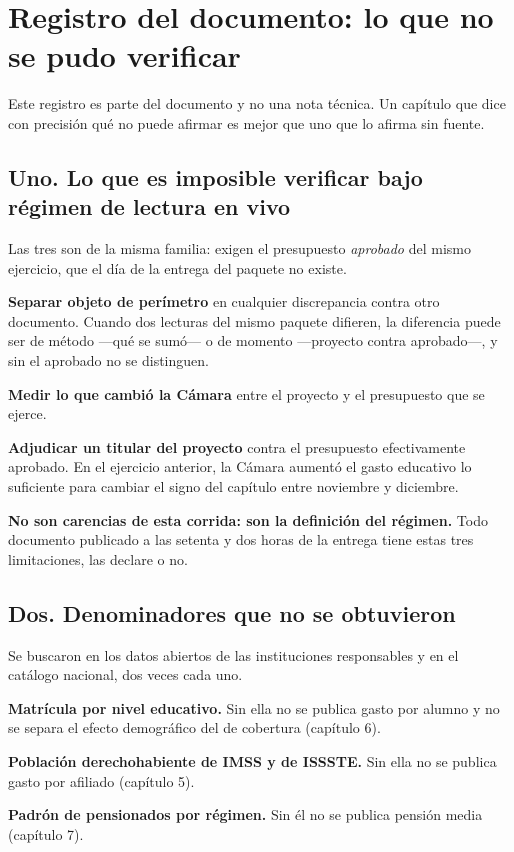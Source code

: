 \chapter*{Registro del documento: lo que no se pudo verificar}

Este registro es parte del documento y no una nota técnica. Un capítulo que dice con precisión
qué no puede afirmar es mejor que uno que lo afirma sin fuente.

\section*{Uno. Lo que es imposible verificar bajo régimen de lectura en vivo}

Las tres son de la misma familia: exigen el presupuesto \emph{aprobado} del mismo ejercicio,
que el día de la entrega del paquete no existe.

\begin{list}{}{\setlength{\leftmargin}{1.4em}\setlength{\itemsep}{3pt}}
\item[1.] \textbf{Separar objeto de perímetro} en cualquier discrepancia contra otro
documento. Cuando dos lecturas del mismo paquete difieren, la diferencia puede ser de método
---qué se sumó--- o de momento ---proyecto contra aprobado---, y sin el aprobado no se
distinguen.
\item[2.] \textbf{Medir lo que cambió la Cámara} entre el proyecto y el presupuesto que se
ejerce.
\item[3.] \textbf{Adjudicar un titular del proyecto} contra el presupuesto efectivamente
aprobado. En el ejercicio anterior, la Cámara aumentó el gasto educativo lo suficiente para
cambiar el signo del capítulo entre noviembre y diciembre.
\end{list}

\textbf{No son carencias de esta corrida: son la definición del régimen.} Todo documento
publicado a las setenta y dos horas de la entrega tiene estas tres limitaciones, las declare o
no.

\section*{Dos. Denominadores que no se obtuvieron}

Se buscaron en los datos abiertos de las instituciones responsables y en el catálogo nacional,
dos veces cada uno.

\begin{list}{}{\setlength{\leftmargin}{1.4em}\setlength{\itemsep}{2pt}}
\item[$\bullet$] \textbf{Matrícula por nivel educativo.} Sin ella no se publica gasto por
alumno y no se separa el efecto demográfico del de cobertura (capítulo 6).
\item[$\bullet$] \textbf{Población derechohabiente de IMSS y de ISSSTE.} Sin ella no se
publica gasto por afiliado (capítulo 5).
\item[$\bullet$] \textbf{Padrón de pensionados por régimen.} Sin él no se publica pensión
media (capítulo 7).
\end{list}


